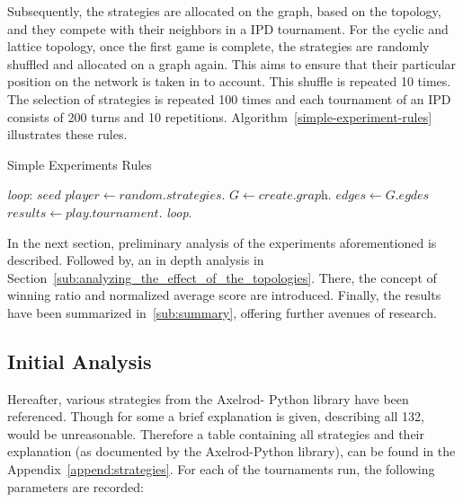 Subsequently, the strategies are allocated on the graph, based
on the topology, and they compete with their neighbors in a IPD tournament.
For the cyclic and lattice topology, once the first game is complete,
the strategies are randomly shuffled and allocated on a graph again. This aims
to ensure that their particular position on the network is taken in to account.
This shuffle is repeated 10 times. The selection of strategies is repeated 100 times
and each tournament of an IPD consists of 200 turns and 10 repetitions.
Algorithm~\ref{simple-experiment-rules} illustrates these rules.

\begin{algorithm}
	\caption{Simple Experiments Rules}\label{simple-experiment-rules}
	\begin{algorithmic}
		\BState \emph{loop}:
		\State $seed$ 
		\State $player \gets \textit{random.strategies}$.
		\State $G \gets \textit{create.graph}$.
		\State $edges \gets \textit{G.egdes}$
		\State $results \gets \textit{play.tournament}$.
		\emph{loop}.
		\EndFor
		\EndFor
		\EndProcedure
	\end{algorithmic}
\end{algorithm}

In the next section, preliminary analysis of the experiments aforementioned
is described. Followed by, an in depth analysis in Section~\ref{sub:analyzing_the_effect_of_the_topologies}.
There, the concept of winning ratio and normalized average score are introduced.
Finally, the results have been summarized in~\ref{sub:summary}, offering further
avenues of research.

\subsection{Initial Analysis}
\label{sub:initial_analysis}
Hereafter, various strategies from the Axelrod- Python library have been referenced.
Though for some a brief explanation is given, describing all 132, would be
unreasonable. Therefore a table containing all strategies and their explanation
(as documented by the Axelrod-Python library), can be found in the Appendix~\ref{append:strategies}.
For each of the tournaments run, the following parameters are recorded:

